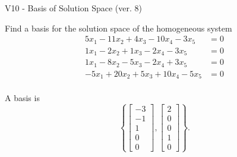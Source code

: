 \begin{exercise}
  \begin{exerciseTitle}V10 - Basis of Solution Space (ver. 8)\end{exerciseTitle}
  \begin{exerciseStatement}
    Find a basis for the solution space of the homogeneous system 
\begin{align*}
 5 x_ 1 -11 x_ 2 + 4 x_ 3 -10 x_ 4 -3 x_ 5 &= 0  \\ 
  1 x_ 1 -2 x_ 2 + 1 x_ 3 -2 x_ 4 -3 x_ 5 &= 0  \\ 
  1 x_ 1 -8 x_ 2 -5 x_ 3 -2 x_ 4 + 3 x_ 5 &= 0  \\ 
  -5 x_ 1 + 20 x_ 2 + 5 x_ 3 + 10 x_ 4 -5 x_ 5 &= 0  \\ 
 \end{align*}


 
  \end{exerciseStatement}

  \begin{exerciseAnswer}
   A basis is   
\[\left\{\left[\begin{array}{c}
-3 \\
-1 \\
1 \\
0 \\
0
\end{array}\right] , \left[\begin{array}{c}
2 \\
0 \\
0 \\
1 \\
0
\end{array}\right]\right\}.\]

  


  \end{exerciseAnswer}
\end{exercise}